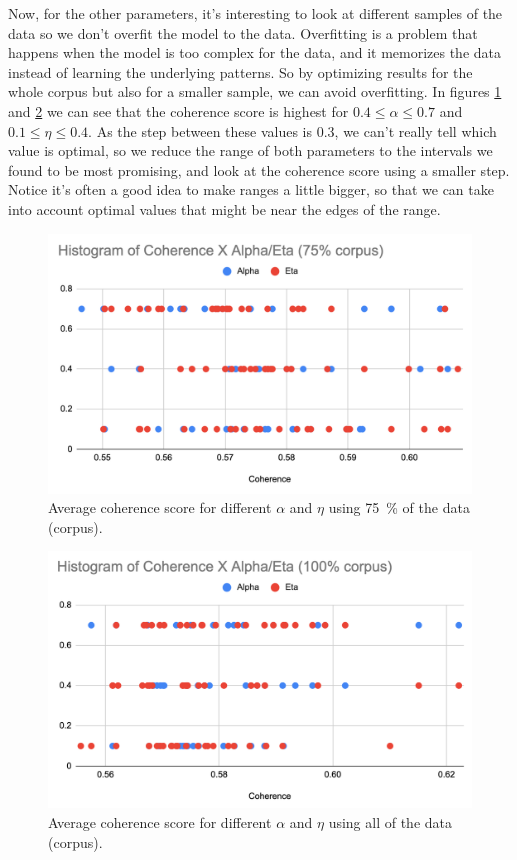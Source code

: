 \documentclass[11pt, conference, onecolumn, final]{IEEEtran}
\begin{document}
Now, for the other parameters, it's interesting to look at different samples of
the data so we don't overfit the model to the data.
Overfitting is a problem that happens when the model is too complex for the
data, and it memorizes the data instead of learning the underlying patterns.
So by optimizing results for the whole corpus but also for a smaller sample, we
can avoid overfitting.
In figures \cref{fig:75p-coherenceXalpha-eta} and
\cref{fig:100p-coherenceXalpha-eta} we can see that the coherence score is
highest for $0.4 \leqslant \alpha \leqslant 0.7$ and
$0.1 \leqslant \eta \leqslant 0.4$.
As the step between these values is $0.3$, we can't really tell which value is
optimal, so we reduce the range of both parameters to the intervals we found to
be most promising, and look at the coherence score using a smaller step.
Notice it's often a good idea to make ranges a little bigger, so that we can
take into account optimal values that might be near the edges of the range.

\begin{figure}[H]
    \centering
    \includegraphics[width=0.7\linewidth]{75p-coherenceXalpha-eta.png}
    \caption{Average coherence score for different $\alpha$ and $\eta$ using
        \qty{75}{\percent} of the data (corpus).}
    \label{fig:75p-coherenceXalpha-eta}
\end{figure}

\begin{figure}[H]
    \centering
    \includegraphics[width=0.7\linewidth]{100p-coherenceXalpha-eta.png}
    \caption{Average coherence score for different $\alpha$ and $\eta$ using
        all of the data (corpus).}
    \label{fig:100p-coherenceXalpha-eta}
\end{figure}
\end{document}
